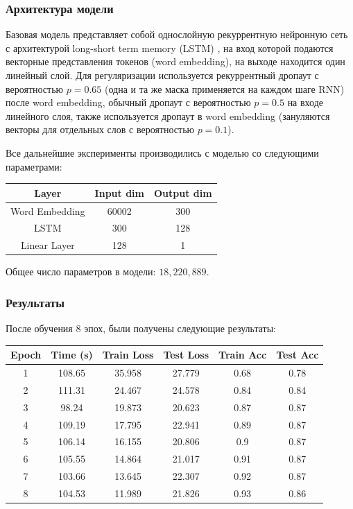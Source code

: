 \documentclass[12pt]{article}
\begin{document}
\subsubsection*{Архитектура модели}
Базовая модель представляет собой однослойную рекуррентную нейронную сеть с архитектурой long-short term memory (LSTM) \cite{Hochreiter:1997:LSM:1246443.1246450}, на вход которой подаются векторные представления
токенов (word embedding), на выходе находится один линейный слой. Для регуляризации используется рекуррентный дропаут \cite{1512.05287} с вероятностью $p=0.65$ (одна и та же маска применяется на каждом шаге RNN) после word embedding,
обычный дропаут \cite{JMLR:v15:srivastava14a} с вероятностью $p=0.5$ на входе линейного слоя, также используется дропаут в word embedding \cite{1512.05287} (зануляются векторы для отдельных слов с вероятностью $p=0.1$).

Все дальнейшие эксперименты производились с моделью со следующими параметрами:
\begin{center}
  \begin{tabular}{ c  c  c }
    \hline
    Layer & Input dim & Output dim \\ \hline
    Word Embedding & 60002 & 300 \\
    LSTM & 300 & 128 \\
    Linear Layer & 128 & 1 \\ \hline
  \end{tabular}
\end{center}

Общее число параметров в модели: $18,220,889$.

\newpage

\subsubsection*{Результаты}
После обучения $8$ эпох, были получены следующие результаты:

\begin{center}
\begin{tabular}{cccccc}
  \hline
  Epoch & Time (s) & Train Loss & Test Loss & Train Acc & Test Acc \\ \hline
  1 & 108.65 & 35.958 & 27.779 & 0.68 & 0.78 \\
  2 & 111.31 & 24.467 & 24.578 & 0.84 & 0.84 \\
  3 & 98.24 & 19.873 & 20.623 & 0.87 & 0.87 \\
  4 & 109.19 & 17.795 & 22.941 & 0.89 & 0.87 \\
  5 & 106.14 & 16.155 & 20.806 & 0.9 & 0.87 \\
  6 & 105.55 & 14.864 & 21.017 & 0.91 & 0.87 \\
  7 & 103.66 & 13.645 & 22.307 & 0.92 & 0.87 \\
  8 & 104.53 & 11.989 & 21.826 & 0.93 & 0.86 \\ \hline
\end{tabular}
\end{center}
\end{document}
